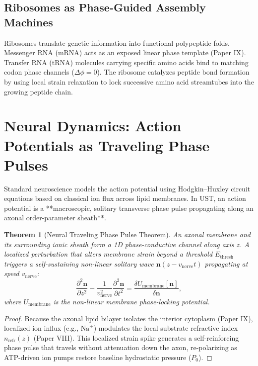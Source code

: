 \documentclass[11pt,a4paper]{article}
\newtheorem{thm}{Theorem}
\begin{document}
	\subsection{Ribosomes as Phase-Guided Assembly Machines}
	Ribosomes translate genetic information into functional polypeptide folds. Messenger RNA ($\text{mRNA}$) acts as an exposed linear phase template (Paper IX). Transfer RNA ($\text{tRNA}$) molecules carrying specific amino acids bind to matching codon phase channels ($\Delta \phi = 0$). The ribosome catalyzes peptide bond formation by using local strain relaxation to lock successive amino acid streamtubes into the growing peptide chain.
	
	\section{Neural Dynamics: Action Potentials as Traveling Phase Pulses}
	\label{sec:neural_dynamics}
	
	Standard neuroscience models the action potential using Hodgkin--Huxley circuit equations based on classical ion flux across lipid membranes. In UST, an action potential is a **macroscopic, solitary transverse phase pulse propagating along an axonal order-parameter sheath**.
	
	\begin{thm}[Neural Traveling Phase Pulse Theorem]
		\label{thm:neural_phase_pulse}
		An axonal membrane and its surrounding ionic sheath form a 1D phase-conductive channel along axis $z$. A localized perturbation that alters membrane strain beyond a threshold $E_{\text{thresh}}$ triggers a self-sustaining non-linear solitary wave $\mathbf{n}(z - v_{\text{nerve}} t)$ propagating at speed $v_{\text{nerve}}$:
		\begin{equation}
			\frac{\partial^2 \mathbf{n}}{\partial z^2} - \frac{1}{v_{\text{nerve}}^2} \frac{\partial^2 \mathbf{n}}{\partial t^2} = \frac{\delta U_{\text{membrane}}[\mathbf{n}]}{\delta \mathbf{n}},
			\label{eq:neural_soliton_pde}
		\end{equation}
		where $U_{\text{membrane}}$ is the non-linear membrane phase-locking potential.
	\end{thm}
	
	\begin{proof}
		Because the axonal lipid bilayer isolates the interior cytoplasm (Paper IX), localized ion influx (e.g., $\text{Na}^+$) modulates the local substrate refractive index $n_{\text{refr}}(z)$ (Paper VIII). This localized strain spike generates a self-reinforcing phase pulse that travels without attenuation down the axon, re-polarizing as ATP-driven ion pumps restore baseline hydrostatic pressure ($P_0$).
	\end{proof}
	
\end{document}
